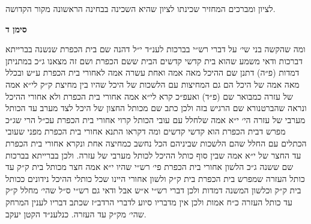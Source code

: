 \documentclass[12pt, openany]{book}
\newcommand{\chapname}{}
\newcommand{\newchap}[1]{
	\addcontentsline{toc}{chapter}{#1}
	\renewcommand{\chapname}{#1}
		\begin{center}
			\textbf{%
\fontsize{16pt}{16pt}\selectfont
				#1}
		\end{center}
}
\begin{document}
\begin{multicols}{2}
לציון ומברכים המחזיר שכינתו לציון שהיא השכינה בבחינה הראשונה מקור הקדושה.\\\vspace{0pt}

\end{multicols}\newpage

\newchap{סימן ד}
\begin{multicols}{2}
ומה שהקשה בני שי׳ על דברי רש״י בברכות לענ״ד י״ל דהנה שם בית הכפרת שנשנה בברייתא דברכות ודאי משמע שהוא בית קדשי קדשים הבית ששם הכפרת ושם זה מצאנו ג״כ במתניתן דמדות (פ״ה) דתנן שם ההיכל מאה אמה ואחת עשרה אמה לאחורי בית הכפרת ע״ש ובכלל מאה אמה של היכל הם גם המחיצות עם הלשכות של היכל שהיו בין מחיצת ק״ק לי״א אמה של עזרה כמבואר שם (פ״ד) ואעפ״כ קרא לי״א אמה אחורי בית הכפרת ולא אחורי ההיכל ונראה שהברטנורא שם הרגיש בזה ולכן כתב שם מכותל החצון של היכל לצד מערב עד הכותל מערבי של עזרה הי׳ י״א אמה שלחלל עם עובי הכותל קרוי אחורי בית הכפרת עכ״ל הרי שג״כ מפרש דבית הכפרת הוא קדשי קדשים ומה דקראו התנא אחורי בית הכפרת מפני שעובי הכתלים עם החלל שהם הלשכות שביניהם הכל נחשב כמחיצה אחת ונקרא אחורי בית הכפרת עד החצר של י״א אמה שבין סוף כותל ההיכל לכותל מערבי של עזרה. ולכן בברייתא בברכות שם ששנה ג״כ הלשון אחורי בית הכפרת פי׳ רש״י שהיו י״א אמה חצר מכותל בית ק״ק עד כותל העזרה שמפרש בית הכפרת בית ק״ק ולשון אחורי היינו שכל כותלי ההיכל נידונים ככותל בית ק״ק וכלשון המשנה דמדות ולכן דברי רש״י א״ש אבל ודאי גם רש״י ס״ל שהי׳ מחלל ק״ק עד כותל העזרה כ״ח אמות ולכן אין מדבריו סיוע לדברי הרדב״ז שכתב דבריו לענין המרחק שהי׳ מק״ק עד העזרה. כנלענ״ד הקטן יעקב.\\\vspace{0pt}

\end{multicols}\newpage
\end{document}
